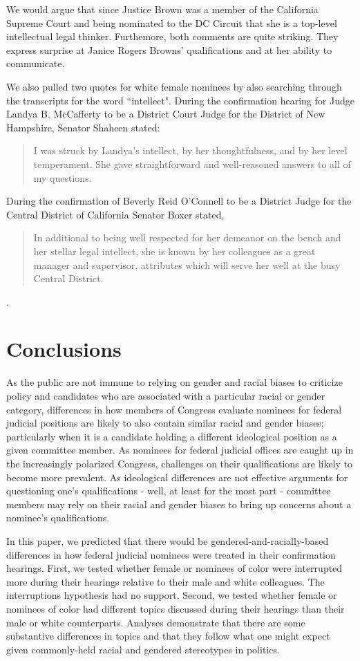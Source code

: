 \documentclass [12pt]{article}
\begin{document}
We would argue that since Justice Brown was a member of the California Supreme Court and being nominated to the DC Circuit that she is a top-level intellectual legal thinker. Furthemore, both comments are quite striking. They express surprise at  Janice Rogers Browns' qualifications and at her ability to communicate. 

We also pulled two quotes for white female nominees by also searching through the transcripts for the word ``intellect". During the confirmation hearing for Judge Landya B. McCafferty to be a District Court Judge for the District of New Hampshire, Senator Shaheen stated:
\begin{quote} I was struck by Landya's intellect, by her thoughtfulness, and by her level temperament. She gave straightforward and well-reasoned answers to all of my questions.\end{quote}
During the confirmation of Beverly Reid O'Connell to be a District Judge for the Central District of California Senator Boxer stated, \begin{quote} In additional to being well respected for her demeanor on the bench and her stellar legal intellect, she is known by her colleagues as a great manager and supervisor, attributes which will serve her well at the busy Central District.\end{quote}. 
	    
\section{Conclusions}

As the public are not immune to relying on gender and racial biases to criticize policy and candidates who are associated with a particular racial or gender category, differences in how members of Congress evaluate nominees for federal judicial positions are likely to also contain similar racial and gender biases; particularly when it is a candidate holding a different ideological position as a given committee member. As nominees for federal judicial offices are caught up in the increasingly polarized Congress, challenges on their qualifications are likely to become more prevalent. As ideological differences are not effective arguments for questioning one's qualifications - well, at least for the most part - committee members may rely on their racial and gender biases to bring up concerns about a nominee's qualifications. 

In this paper, we predicted that there would be gendered-and-racially-based differences in how federal judicial nominees were treated in their confirmation hearings. First, we tested whether female or nominees of color were interrupted more during their hearings relative to their male and white colleagues. The interruptions hypothesis had no support. Second, we tested whether female or nominees of color had different topics discussed during their hearings than their male or white counterparts. Analyses demonstrate that there are some substantive differences in topics and that they follow what one might expect given commonly-held racial and gendered stereotypes in politics. 
\end{document}
